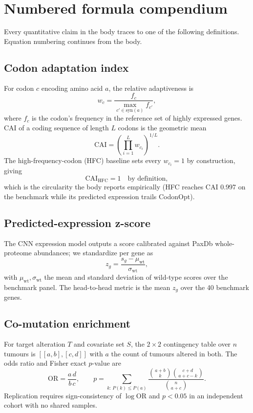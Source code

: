 \appendix
\section{Numbered formula compendium}
Every quantitative claim in the body traces to one of the following definitions. Equation numbering continues from the body.
\subsection{Codon adaptation index}
For codon $c$ encoding amino acid $a$, the relative adaptiveness is
\begin{equation} w_c = \frac{f_c}{\max_{c' \in \mathrm{syn}(a)} f_{c'}}, \end{equation}
where $f_c$ is the codon's frequency in the reference set of highly expressed genes. CAI of a coding sequence of length $L$ codons is the geometric mean
\begin{equation} \mathrm{CAI} = \left( \prod_{i=1}^{L} w_{c_i} \right)^{1/L}. \end{equation}
The high-frequency-codon (HFC) baseline sets every $w_{c_i}=1$ by construction, giving
\begin{equation} \mathrm{CAI}_{\mathrm{HFC}} = 1 \quad \text{by definition}, \end{equation}
which is the circularity the body reports empirically (HFC reaches CAI 0.997 on the benchmark while its predicted expression trails CodonOpt).
\subsection{Predicted-expression z-score}
The CNN expression model outputs a score calibrated against PaxDb whole-proteome abundances; we standardize per gene as
\begin{equation} z_g = \frac{s_g - \mu_{\mathrm{wt}}}{\sigma_{\mathrm{wt}}}, \end{equation}
with $\mu_{\mathrm{wt}}, \sigma_{\mathrm{wt}}$ the mean and standard deviation of wild-type scores over the benchmark panel. The head-to-head metric is the mean $z_g$ over the 40 benchmark genes.
\subsection{Co-mutation enrichment}
For target alteration $T$ and covariate set $S$, the $2\times2$ contingency table over $n$ tumours is $[[a,b],[c,d]]$ with $a$ the count of tumours altered in both. The odds ratio and Fisher exact $p$-value are
\begin{equation} \mathrm{OR} = \frac{a\,d}{b\,c}, \qquad p = \sum_{k:\,P(k)\le P(a)} \frac{\binom{a+b}{k}\binom{c+d}{a+c-k}}{\binom{n}{a+c}}. \end{equation}
Replication requires sign-consistency of $\log \mathrm{OR}$ and $p < 0.05$ in an independent cohort with no shared samples.
